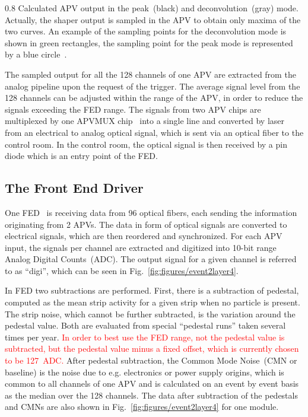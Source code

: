                  {0.8}       %
                 {Calculated APV output in the peak~(black) and deconvolution~(gray) mode. Actually, the shaper output is sampled in the APV to obtain only maxima of the two curves. An example of the sampling points for the deconvolution mode is shown in green rectangles, the sampling point for the peak mode is represented by a blue circle~\cite{Friedl:2001kra}.} %


The sampled output for all the 128 channels of one APV are extracted from the analog pipeline upon the request of the trigger. The average signal level from the 128 channels can be adjusted within the range of the APV, in order to reduce the signals exceeding the FED range. The signals from two APV chips are multiplexed by one APVMUX chip~\cite{Ball:2007zza} into a single line and converted by laser from an electrical to analog optical signal, which is sent via an optical fiber to the control room. In the control room, the optical signal is then received by a pin diode which is an entry point of the FED.


\subsection{The Front End Driver \label{sec:FED}}
One FED~\cite{Baird:2002wg} is receiving data from 96 optical fibers, each sending the information originating from 2 APVs. The data in form of optical signals are converted to electrical signals, which are then reordered and synchronized. For each APV input, the signals per channel are extracted and digitized into 10-bit range Analog Digital Counts~(ADC). The output signal for a given channel is referred to as ``digi'', which can be seen in Fig.~\ref{fig:figures/event2layer4}.

In FED two subtractions are performed. First, there is a subtraction of pedestal, computed as the mean strip activity for a given strip when no particle is present. The strip noise, which cannot be further subtracted, is the variation around the pedestal value. Both are evaluated from special ``pedestal runs'' taken several times per year. \textcolor{red}{In order to best use the FED range, not the pedestal value is subtracted, but the pedestal value minus a fixed offset, which is currently chosen to be 127~ADC.} After pedestal subtraction, the Common Mode Noise~(CMN or baseline) is the noise due to e.g. electronics or power supply origins, which is common to all channels of one APV and is calculated on an event by event basis as the median over the 128 channels. The data after subtraction of the pedestals and CMNs are also shown in Fig.~\ref{fig:figures/event2layer4} for one module. 

